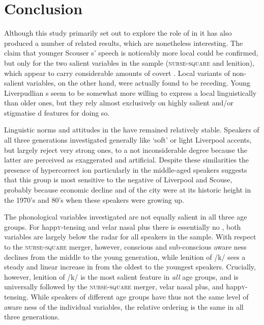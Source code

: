 \chapter{Conclusion}
\label{ch.conclusion}

Although this study primarily set out to explore the role of  in   it has also produced a number of related results, which are nonetheless interesting.
The claim that younger Scouser s' speech is noticeably more local \parencite[cf.][]{watson2007a} could be confirmed, but only for the two salient  variables in the sample (\textsc{nurse}-\textsc{square} and lenition), which appear to carry considerable amounts of covert .
Local variants of non-salient  variables, on the other hand, were actually found to be receding.
Young Liverpudlian s seem to be somewhat more willing to express a local  linguistically than older ones, but they rely almost exclusively on highly salient  and/or stigmatise d features for doing so.

Linguistic norms and attitudes in the  have remained relatively stable.
Speakers of all three generations investigated generally like `soft' or light Liverpool accents, but largely reject very strong ones, to a not inconsiderable degree because the latter are perceived as exaggerated and artificial.
Despite these similarities the presence of hypercorrect ion particularly in the middle-aged speakers suggests that this group is most sensitive to the negative  of Liverpool and Scouse, probably because economic decline and  of the city were at its historic height in the 1970's and 80's when these speakers were growing up.

The phonological variables investigated are not equally salient  in all three age groups.
For happ\textsc{y}-tensing and velar nasal plus there is essentially no , both variables are largely below the radar for all speakers in the sample.
With respect to the \textsc{nurse}-\textsc{square} merger, however, conscious  and sub-conscious  aware ness declines from the middle to the young generation, while lenition of /k/ sees a steady and linear increase in  from the oldest to the youngest speakers.
Crucially, however, lenition of /k/ is the most salient  feature in \emph{all} age groups, and is universally followed by the \textsc{nurse}-\textsc{square} merger, velar nasal plus, and happ\textsc{y}-tensing.
While speakers of different age groups have thus not the same level of aware ness of the individual variables, the relative ordering is the same in all three generations.

